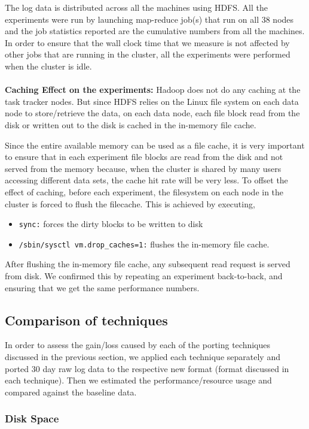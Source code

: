 \documentclass[11pt,a4paper]{article}
\newcommand{\resitem}[1]{\item #1 \vspace{-7pt}}
\begin{document}
The log data is distributed across all the machines using HDFS. All the experiments were run by launching map-reduce job(s) that run on all 38 nodes and the job statistics reported are the cumulative numbers from all the machines. In order to ensure that the wall clock time that we measure is not affected by other jobs that are running in the cluster, all the experiments were performed when the cluster is idle.
\\\\
\textbf{Caching Effect on the experiments:} Hadoop does not do any caching at the task tracker nodes. But since HDFS relies on the Linux file system on each data node to store/retrieve the data, on each data node, each file block read from the disk or written out to the disk is cached in the in-memory file cache. 

Since the entire available memory can be used as a file cache, it is very important to ensure that in each experiment file blocks are read from the disk and not served from the memory because, when the cluster is shared by many users accessing different data sets, the cache hit rate will be very less. To offset the effect of caching, before each experiment, the filesystem on each node in the cluster is forced to flush the filecache. This is achieved by executing,

\begin{itemize}
	\resitem {\texttt{sync:} forces the dirty blocks to be written to disk}
	\resitem {\texttt{/sbin/sysctl vm.drop\_caches=1:} flushes the in-memory file cache.}
\end{itemize}
\noindent
After flushing the in-memory file cache, any subsequent read request is served from disk. We confirmed this by repeating an experiment back-to-back, and ensuring that we get the same performance numbers.

\subsection{Comparison of techniques}
In order to assess the gain/loss caused by each of the porting techniques discussed in the previous section, we applied each technique separately and ported 30 day raw log data to the respective new format (format discussed in each technique). Then we estimated the performance/resource usage and compared against the baseline data.

\subsubsection{Disk Space}
\end{document}
